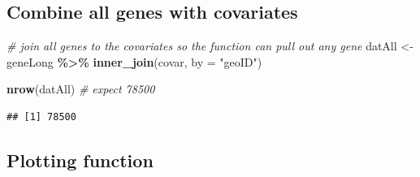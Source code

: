 \documentclass[
]{article}
\newenvironment{Shaded}{\begin{snugshade}}{\end{snugshade}}
\newcommand{\AttributeTok}[1]{\textcolor[rgb]{0.13,0.29,0.53}{#1}}
\newcommand{\CommentTok}[1]{\textcolor[rgb]{0.56,0.35,0.01}{\textit{#1}}}
\newcommand{\FunctionTok}[1]{\textcolor[rgb]{0.13,0.29,0.53}{\textbf{#1}}}
\newcommand{\NormalTok}[1]{#1}
\newcommand{\OtherTok}[1]{\textcolor[rgb]{0.56,0.35,0.01}{#1}}
\newcommand{\SpecialCharTok}[1]{\textcolor[rgb]{0.81,0.36,0.00}{\textbf{#1}}}
\newcommand{\StringTok}[1]{\textcolor[rgb]{0.31,0.60,0.02}{#1}}
\begin{document}
\subsection{Combine all genes with
covariates}\label{combine-all-genes-with-covariates}

\begin{Shaded}
\begin{Highlighting}[]
\CommentTok{\# join all genes to the covariates so the function can pull out any gene}
\NormalTok{datAll }\OtherTok{\textless{}{-}}\NormalTok{ geneLong }\SpecialCharTok{\%\textgreater{}\%}
  \FunctionTok{inner\_join}\NormalTok{(covar, }\AttributeTok{by =} \StringTok{"geoID"}\NormalTok{)}

\FunctionTok{nrow}\NormalTok{(datAll)   }\CommentTok{\# expect 78500}
\end{Highlighting}
\end{Shaded}

\begin{verbatim}
## [1] 78500
\end{verbatim}

\subsection{Plotting function}\label{plotting-function}
\end{document}
